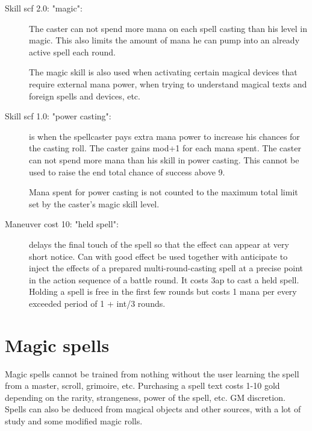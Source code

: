 \begin{description}


\item[Skill scf 2.0: "magic":] The caster can not spend more mana on each spell casting than his level in magic. This also limits the amount of mana he can pump into an already active spell each round.

The magic skill is also used when activating certain magical devices that require external mana power, when trying to understand magical texts and foreign spells and devices, etc.


\item[Skill scf 1.0: "power casting":] is when the spellcaster pays extra mana power to increase his chances for the casting roll. The caster gains mod+1 for each mana spent. The caster can not spend more mana than his skill in power casting. This cannot be used to raise the end total chance of success above 9.

Mana spent for power casting is not counted to the maximum total limit set by the caster's magic skill level.


\item[Maneuver cost 10: "held spell":] delays the final touch of the spell so that the effect can appear at very short notice. Can with good effect be used together with anticipate to inject the effects of a prepared multi-round-casting spell at a precise point in the action sequence of a battle round. It costs 3ap to cast a held spell. Holding a spell is free in the first few rounds but costs 1 mana per every exceeded period of 1 + int/3 rounds.


\end{description}







\section*{Magic spells}

Magic spells cannot be trained from nothing without the user learning the spell from a master, scroll, grimoire, etc. Purchasing a spell text costs 1-10 gold depending on the rarity, strangeness, power of the spell, etc. GM discretion.
Spells can also be deduced from magical objects and other sources, with a lot of study and some modified magic rolls.

